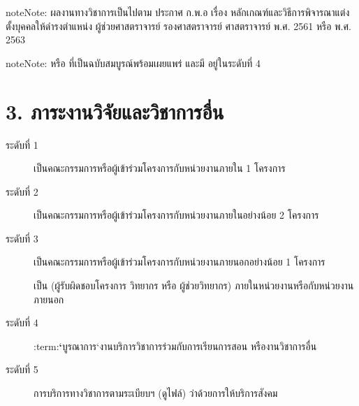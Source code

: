 \documentclass[a4paper,12pt,english]{sphinxmanual}
\begin{document}
\begin{sphinxadmonition}{note}{Note:}
ผลงานทางวิชาการเป็นไปตาม ประกาศ ก.พ.อ เรื่อง หลักเกณฑ์และวิธีการพิจารณาแต่งตั้งบุคคลให้ดำรงตำแหน่ง ผู้ช่วยศาสตราจารย์ รองศาสตราจารย์ ศาสตราจารย์ พ.ศ. 2561 หรือ พ.ศ. 2563
\end{sphinxadmonition}

\begin{sphinxadmonition}{note}{Note:}
{\hyperref[\detokenize{glossary:term-0}]{}} หรือ {\hyperref[\detokenize{glossary:term-1}]{}} ที่เป็นฉบับสมบูรณ์พร้อมเผยแพร่ และมี {\hyperref[\detokenize{glossary:term-7}]{}} อยู่ในระดับที่ 4
\end{sphinxadmonition}


\section{3. ภาระงานวิจัยและวิชาการอื่น}
\label{\detokenize{submission_part1:id16}}\begin{description}
\item[{ระดับที่ 1}] \leavevmode
เป็นคณะกรรมการหรือผู้เข้าร่วมโครงการกับหน่วยงานภายใน 1 โครงการ

\item[{ระดับที่ 2}] \leavevmode
เป็นคณะกรรมการหรือผู้เข้าร่วมโครงการกับหน่วยงานภายในอย่างน้อย 2 โครงการ

\item[{ระดับที่ 3}] \leavevmode
เป็นคณะกรรมการหรือผู้เข้าร่วมโครงการกับหน่วยงานภายนอกอย่างน้อย 1 โครงการ

 เป็น {\hyperref[\detokenize{glossary:term-5}]{}} (ผู้รับผิดชอบโครงการ วิทยากร หรือ ผู้ช่วยวิทยากร) ภายในหน่วยงานหรือกับหน่วยงานภายนอก

\item[{ระดับที่ 4}] \leavevmode
:term:{\color{red}\bfseries{}`}บูรณาการ`งานบริการวิชาการร่วมกับการเรียนการสอน หรืองานวิชาการอื่น

\end{description}
\begin{description}
\item[{ระดับที่ 5}] \leavevmode
การบริการทางวิชาการตามระเบียบฯ (ดูไฟล์) ว่าด้วยการให้บริการสังคม

\end{description}
\end{document}
